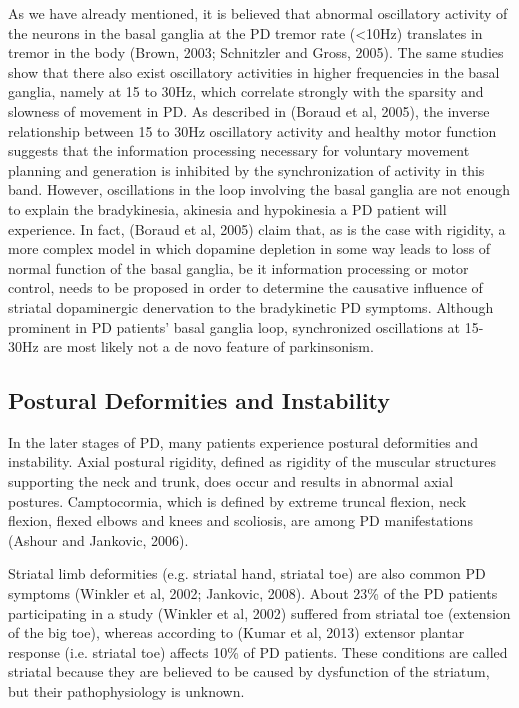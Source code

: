 As we have already mentioned, it is believed that abnormal oscillatory activity of the neurons in the basal ganglia at the \gls{PD} tremor rate (\textless10Hz) translates in tremor in the body (Brown, 2003; Schnitzler and Gross, 2005). The same studies show that there also exist oscillatory activities in higher frequencies in the basal ganglia, namely at 15 to 30Hz, which correlate strongly with the sparsity and slowness of movement in \gls{PD}. As described in (Boraud et al, 2005), the inverse relationship between 15 to 30Hz oscillatory activity and healthy motor function suggests that the information processing necessary for voluntary movement planning and generation is inhibited by the synchronization of activity in this band. However, oscillations in the loop involving the basal ganglia are not enough to explain the bradykinesia, akinesia and hypokinesia a \gls{PD} patient will experience. In fact, (Boraud et al, 2005) claim that, as is the case with rigidity, a more complex model in which dopamine depletion in some way leads to loss of normal function of the basal ganglia, be it information processing or motor control, needs to be proposed in order to determine the causative influence of striatal dopaminergic denervation to the bradykinetic \gls{PD} symptoms. Although prominent in \gls{PD} patients' basal ganglia loop, synchronized oscillations at 15-30Hz are most likely not a de novo feature of parkinsonism. 



\subsection{Postural Deformities and Instability}
\label{subsec:instability}
In the later stages of \gls{PD}, many patients experience postural deformities and instability. Axial postural rigidity, defined as rigidity of the muscular structures supporting the neck and trunk, does occur and results in abnormal axial postures. Camptocormia, which is defined by extreme truncal flexion, neck flexion, flexed elbows and knees and scoliosis, are among \gls{PD} manifestations (Ashour and Jankovic, 2006).

Striatal limb deformities (e.g. striatal hand, striatal toe) are also common \gls{PD} symptoms (Winkler et al, 2002; Jankovic, 2008). About 23\% of the \gls{PD} patients participating in a study (Winkler et al, 2002) suffered from striatal toe (extension of the big toe), whereas according to  (Kumar et al, 2013) extensor plantar response (i.e. striatal toe) affects 10\% of \gls{PD} patients. These conditions are called striatal because they are believed to be caused by dysfunction of the striatum, but their pathophysiology is unknown.

